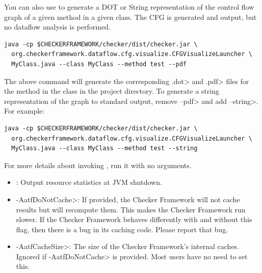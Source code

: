 
You can also use  to generate a DOT
or String representation of the control flow graph of a given method in a given class.
The CFG is generated and output, but no dataflow analysis is performed.

\begin{smaller}
\begin{Verbatim}
java -cp $CHECKERFRAMEWORK/checker/dist/checker.jar \
  org.checkerframework.dataflow.cfg.visualize.CFGVisualizeLauncher \
  MyClass.java --class MyClass --method test --pdf
\end{Verbatim}
\end{smaller}

\noindent
The above command will generate the corresponding \<.dot> and \<.pdf> files for the
method  in the class  in the project directory.
To generate a string representation of the graph to standard output,
remove \<--pdf> and add \<--string>. For example:

\begin{smaller}
\begin{Verbatim}
java -cp $CHECKERFRAMEWORK/checker/dist/checker.jar \
  org.checkerframework.dataflow.cfg.visualize.CFGVisualizeLauncher \
  MyClass.java --class MyClass --method test --string
\end{Verbatim}
\end{smaller}

For more details about invoking
, run it with
no arguments.



\begin{itemize}

\item \code{-AresourceStats}:
  Output resource statistics at JVM shutdown.

\item \<-AatfDoNotCache>:
  If provided, the Checker Framework will not cache results but will
  recompute them.  This makes the Checker Framework run slower.  If the
  Checker Framework behaves differently with and without this flag, then
  there is a bug in its caching code.  Please report that bug.

\item \<-AatfCacheSize>:
  The size of the Checker Framework's internal caches.
  Ignored if \<-AatfDoNotCache> is provided.
  Most users have no need to set this.

\end{itemize}


